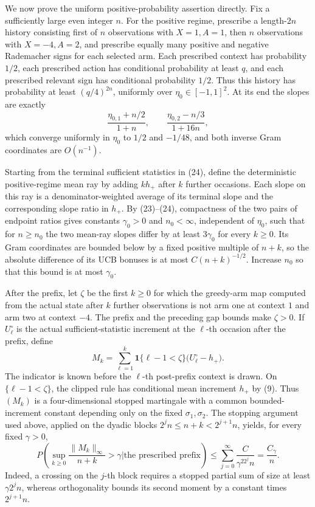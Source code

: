 We now prove the uniform positive-probability assertion directly.  Fix a sufficiently large even integer \(n\).  For the positive regime, prescribe a length-\(2n\) history consisting first of \(n\) observations with \(X=1,A=1\), then \(n\) observations with \(X=-4,A=2\), and prescribe equally many positive and negative Rademacher signs for each selected arm.  Each prescribed context has probability \(1/2\), each prescribed action has conditional probability at least \(q\), and each prescribed relevant sign has conditional probability \(1/2\).  Thus this history has probability at least \((q/4)^{2n}\), uniformly over \(\eta_0\in[-1,1]^2\).  At its end the slopes are exactly
\[
 \frac{\eta_{0,1}+n/2}{1+n},\qquad
 \frac{\eta_{0,2}-n/3}{1+16n}, \tag{24}
\]
which converge uniformly in \(\eta_0\) to \(1/2\) and \(-1/48\), and both inverse Gram coordinates are \(O(n^{-1})\).

Starting from the terminal sufficient statistics in (24), define the deterministic positive-regime mean ray by adding \(kh_+\) after \(k\) further occasions.  Each slope on this ray is a denominator-weighted average of its terminal slope and the corresponding slope ratio in \(h_+\).  By (23)--(24), compactness of the two pairs of endpoint ratios gives constants \(\gamma_0>0\) and \(n_0<\infty\), independent of \(\eta_0\), such that for \(n\geq n_0\) the two mean-ray slopes differ by at least \(3\gamma_0\) for every \(k\geq0\).  Its Gram coordinates are bounded below by a fixed positive multiple of \(n+k\), so the absolute difference of its UCB bonuses is at most \(C(n+k)^{-1/2}\).  Increase \(n_0\) so that this bound is at most \(\gamma_0\).

After the prefix, let \(\zeta\) be the first \(k\geq0\) for which the greedy-arm map computed from the actual state after \(k\) further observations is not arm one at context \(1\) and arm two at context \(-4\).  The prefix and the preceding gap bounds make \(\zeta>0\).  If \(U^{\circ}_\ell\) is the actual sufficient-statistic increment at the \(\ell\)-th occasion after the prefix, define
\[
 M_k=\sum_{\ell=1}^k\mathbf 1\{\ell-1<\zeta\}\bigl(U^{\circ}_\ell-h_+\bigr).
\]
The indicator is known before the \(\ell\)-th post-prefix context is drawn.  On \(\{\ell-1<\zeta\}\), the clipped rule has conditional mean increment \(h_+\) by (9).  Thus \((M_k)\) is a four-dimensional stopped martingale with a common bounded-increment constant depending only on the fixed \(\sigma_1,\sigma_2\).  The stopping argument used above, applied on the dyadic blocks \(2^jn\leq n+k<2^{j+1}n\), yields, for every fixed \(\gamma>0\),
\[
 P\left(\sup_{k\geq0}\frac{\|M_k\|_\infty}{n+k}>\gamma
 \mathrel{\Big|}\text{the prescribed prefix}\right)
 \leq \sum_{j=0}^{\infty}\frac{C}{\gamma^22^jn}
 =\frac{C_\gamma}{n}. \tag{25}
\]
Indeed, a crossing on the \(j\)-th block requires a stopped partial sum of size at least \(\gamma2^jn\), whereas orthogonality bounds its second moment by a constant times \(2^{j+1}n\).

